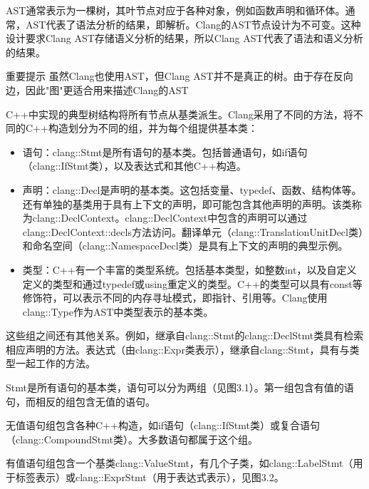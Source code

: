 AST通常表示为一棵树，其叶节点对应于各种对象，例如函数声明和循环体。通常，AST代表了语法分析的结果，即解析。Clang的AST节点设计为不可变。这种设计要求Clang AST存储语义分析的结果，所以Clang AST代表了语法和语义分析的结果。

\begin{myNotic}{重要提示}
虽然Clang也使用AST，但Clang AST并不是真正的树。由于存在反向边，因此"图"更适合用来描述Clang的AST
\end{myNotic}

C++中实现的典型树结构将所有节点从基类派生。Clang采用了不同的方法，将不同的C++构造划分为不同的组，并为每个组提供基本类：

\begin{itemize}
\item
语句：clang::Stmt是所有语句的基本类。包括普通语句，如if语句（clang::IfStmt类），以及表达式和其他C++构造。

\item
声明：clang::Decl是声明的基本类。这包括变量、typedef、函数、结构体等。还有单独的基类用于具有上下文的声明，即可能包含其他声明的声明。该类称为clang::DeclContext。clang::DeclContext中包含的声明可以通过clang::DeclContext::decls方法访问。翻译单元（clang::TranslationUnitDecl类）和命名空间（clang::NamespaceDecl类）是具有上下文的声明的典型示例。

\item
类型：C++有一个丰富的类型系统。包括基本类型，如整数int，以及自定义定义的类型和通过typedef或using重定义的类型。C++的类型可以具有const等修饰符，可以表示不同的内存寻址模式，即指针、引用等。Clang使用clang::Type作为AST中类型表示的基本类。
\end{itemize}

这些组之间还有其他关系。例如，继承自clang::Stmt的clang::DeclStmt类具有检索相应声明的方法。表达式（由clang::Expr类表示），继承自clang::Stmt，具有与类型一起工作的方法。


Stmt是所有语句的基本类，语句可以分为两组（见图3.1）。第一组包含有值的语句，而相反的组包含无值的语句。


无值语句组包含各种C++构造，如if语句（clang::IfStmt类）或复合语句（clang::CompoundStmt类）。大多数语句都属于这个组。

有值语句组包含一个基类clang::ValueStmt，有几个子类，如clang::LabelStmt（用于标签表示）或clang::ExprStmt（用于表达式表示），见图3.2。


